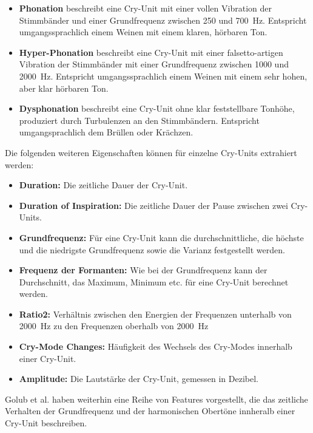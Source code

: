 \begin{itemize}
	 \item \textbf{Phonation} beschreibt eine Cry-Unit mit einer \glqq vollen Vibration der Stimmbänder\grqq{} und einer Grundfrequenz zwischen 250 und \SI{700}{\hertz}. Entspricht umgangssprachlich einem Weinen mit einem \glqq klaren, hörbaren Ton\grqq{}.
	 \item \textbf{Hyper-Phonation} beschreibt eine Cry-Unit mit einer \glqq falsetto-artigen Vibration der Stimmbänder\grqq{} mit einer Grundfrequenz zwischen 1000 und \SI{2000}{\hertz}. Entspricht umgangssprachlich einem Weinen mit einem \glqq sehr hohen, aber klar hörbaren Ton\grqq{}.
	 \item \textbf{Dysphonation} beschreibt eine Cry-Unit ohne klar feststellbare Tonhöhe, produziert durch Turbulenzen an den Stimmbändern. Entspricht umgangsprachlich dem \glqq Brüllen oder Krächzen\grqq{}.
\end{itemize}

Die folgenden weiteren Eigenschaften können für einzelne Cry-Units extrahiert werden:

\begin{itemize}
	\item \textbf{Duration:} Die zeitliche Dauer der Cry-Unit.
	\item \textbf{Duration of Inspiration: }Die zeitliche Dauer der Pause zwischen zwei Cry-Units.
	\item \textbf{Grundfrequenz:} Für eine Cry-Unit kann die durchschnittliche, die höchste und die niedrigste Grundfrequenz sowie die Varianz festgestellt werden.
	\item \textbf{Frequenz der Formanten:} Wie bei der Grundfrequenz kann der Durchschnitt, das Maximum, Minimum etc. für eine Cry-Unit berechnet werden.
	\item \textbf{Ratio2: } Verhältnis zwischen den Energien der Frequenzen unterhalb von \SI{2000}{\hertz} zu den Frequenzen oberhalb von \SI{2000}{\hertz}
	\item \textbf{Cry-Mode Changes:} Häufigkeit des Wechsels des Cry-Modes innerhalb einer Cry-Unit.
	\item \textbf{Amplitude:} Die Lautstärke der Cry-Unit, gemessen in Dezibel. \cite[S. 85]{parentalPerception} \cite[S. 156]{threeCryTypes}
\end{itemize}

Golub et al. haben weiterhin eine Reihe von Features vorgestellt, die das zeitliche Verhalten der Grundfrequenz und der harmonischen Obertöne innheralb einer Cry-Unit beschreiben. \cite[S. 73]{cryModel}

